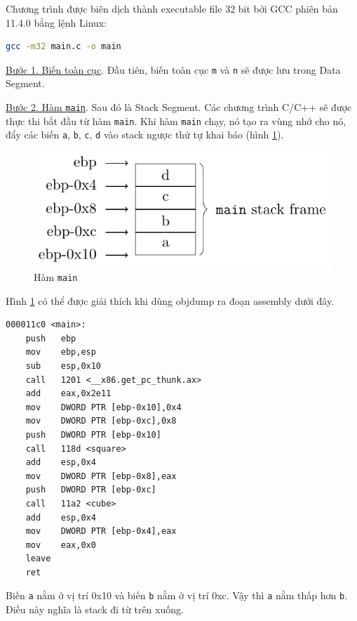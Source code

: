 Chương trình được biên dịch thành executable file 32 bit bởi GCC phiên bản 11.4.0 bằng lệnh Linux:

\begin{lstlisting}[language=bash]
    gcc -m32 main.c -o main
\end{lstlisting}

\underline{Bước 1. Biến toàn cục}. Đầu tiên, biến toàn cục \texttt{m} và \texttt{n} sẽ được lưu trong Data Segment. 

\underline{Bước 2. Hàm \texttt{main}}. Sau đó là Stack Segment. Các chương trình C/C++ sẽ được thực thi bắt đầu từ hàm \texttt{main}. Khi hàm \texttt{main} chạy, nó tạo ra vùng nhớ cho nó, đẩy các biến \texttt{a}, \texttt{b}, \texttt{c}, \texttt{d} vào stack ngược thứ tự khai báo (hình \ref{stack:1}).

\begin{figure}[ht]
    \centering
    \includegraphics[page=1]{assembly/stack.pdf}
    \caption{Hàm \texttt{main}}
    \label{stack:1}
\end{figure}

Hình \ref{stack:1} có thể được giải thích khi dùng objdump ra đoạn assembly dưới đây.

\begin{lstlisting}[language={[x86masm]Assembler}]
000011c0 <main>:
    push   ebp
    mov    ebp,esp
    sub    esp,0x10
    call   1201 <__x86.get_pc_thunk.ax>
    add    eax,0x2e11
    mov    DWORD PTR [ebp-0x10],0x4
    mov    DWORD PTR [ebp-0xc],0x8
    push   DWORD PTR [ebp-0x10]
    call   118d <square>
    add    esp,0x4
    mov    DWORD PTR [ebp-0x8],eax
    push   DWORD PTR [ebp-0xc]
    call   11a2 <cube>
    add    esp,0x4
    mov    DWORD PTR [ebp-0x4],eax
    mov    eax,0x0
    leave  
    ret 
\end{lstlisting}

Biến \texttt{a} nằm ở vị trí 0x10 và biến \texttt{b} nằm ở vị trí 0xc. Vậy thì \texttt{a} nằm thấp hơn \texttt{b}. Điều này nghĩa là stack đi từ trên xuống.

